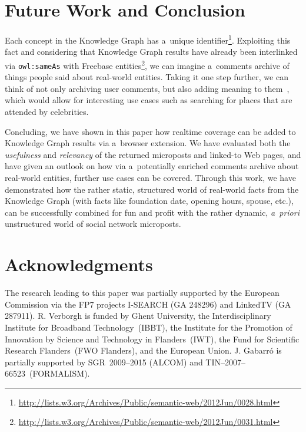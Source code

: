 \documentclass[runningheads,a4paper]{llncs}
\begin{document}

\section{Future Work and Conclusion}
Each concept in the Knowledge Graph has a~unique identifier\footnote{\url{http://lists.w3.org/Archives/Public/semantic-web/2012Jun/0028.html}}.
Exploiting this fact and considering that Knowledge Graph results
have already been interlinked via \texttt{owl:sameAs}
with Freebase entities\footnote{\url{http://lists.w3.org/Archives/Public/semantic-web/2012Jun/0031.html}},
we can imagine a~comments archive of things people said about real-world entities.
Taking it one step further, we can think of not only archiving user comments,
but also adding meaning to them~\cite{steiner2013},
which would allow for interesting use cases
such as searching for places that are attended by celebrities.

Concluding, we have shown in this paper how realtime coverage
can be added to Knowledge Graph results via a~browser extension.
We have evaluated both the \emph{usefulness} and \emph{relevancy}
of the returned microposts and linked-to Web pages,
and have given an outlook on how via a~potentially enriched comments archive
about real-world entities, further use cases can be covered.
Through this work, we have demonstrated how the rather static, structured world
of real-world facts from the Knowledge Graph
(with facts like foundation date, opening hours, spouse, etc.),
can be successfully combined for fun and profit
with the rather dynamic, \emph{a~priori} unstructured world
of social network microposts.


\section*{Acknowledgments}
\small
The research leading to this paper was partially supported by the European Commission via the FP7 projects \mbox{I-SEARCH} (GA 248296) and LinkedTV (GA 287911).
R. Verborgh is funded by Ghent University,
the Interdisciplinary Institute for Broadband Technology~(\mbox{IBBT}),
the Institute for the Promotion of Innovation by Science and Technology in Flanders~(\mbox{IWT}),
the Fund for Scientific Research Flanders~(\mbox{FWO} Flanders), and the European Union.
J. Gabarr\'o is partially supported by \mbox{SGR}~2009--2015 (\mbox{ALCOM}) and
\mbox{TIN}--2007--66523~(\mbox{FORMALISM}).



\end{document}
